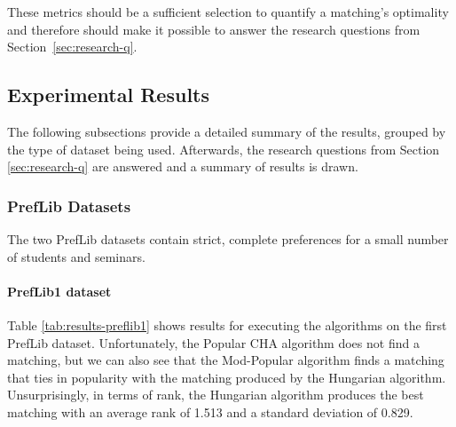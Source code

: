 These metrics should be a sufficient selection to quantify a matching's optimality and therefore should make it possible to answer the research questions from \mbox{Section \ref{sec:research-q}.}

\subsection{Experimental Results}
The following subsections provide a detailed summary of the results, grouped by the type of dataset being used. Afterwards, the research questions from Section \ref{sec:research-q} are answered and a summary of results is drawn.

\subsubsection{PrefLib Datasets}
The two PrefLib datasets contain strict, complete preferences for a small number of students and seminars.

\paragraph{PrefLib1 dataset}
Table \ref{tab:results-preflib1} shows results for executing the algorithms on the first PrefLib dataset. Unfortunately, the Popular CHA algorithm does not find a matching, but we can also see that the Mod-Popular algorithm finds a matching that ties in popularity with the matching produced by the Hungarian algorithm. Unsurprisingly, in terms of rank, the Hungarian algorithm produces the best matching with an average rank of 1.513 and a standard deviation of 0.829.

\begin{table}[h!]
  \centering
  \caption{Summary of the results for PrefLib1}
  \label{tab:results-preflib1}
\end{table}

